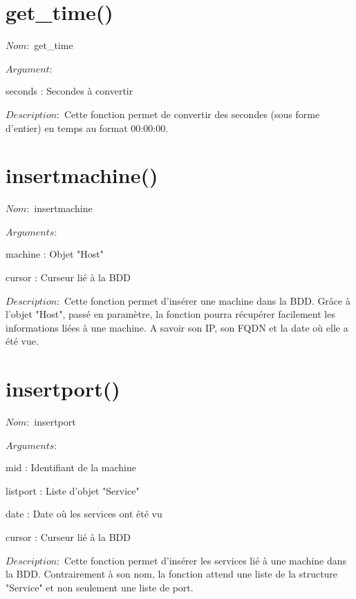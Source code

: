 \documentclass[12pt]{report}
\begin{document}
		\section{get\_time()}
			{\setlength{\parindent}{0cm}
			$Nom :$ get\_time\\\\
			}
			$Argument :$
			\begin{description}
				\item seconds : Secondes à convertir
			\end{description}
			$Description :$ Cette fonction permet de convertir des secondes (sous forme d'entier) en temps au format 00:00:00.
		\section{insertmachine()}
			{\setlength{\parindent}{0cm}
			$Nom :$ insertmachine\\\\
			}
			$Arguments :$
			\begin{description}
				\item machine : Objet "Host"
				\item cursor : Curseur lié à la BDD\\
			\end{description}
			$Description : $ Cette fonction permet d'insérer une machine dans la BDD. Grâce à l'objet "Host", passé en paramètre, la fonction pourra récupérer facilement les informations liées à une machine. A savoir son IP, son FQDN et la date où elle a été vue.
		\section{insertport()}
			{\setlength{\parindent}{0cm}
			$Nom :$ insertport\\\\
			}
			$Arguments :$
			\begin{description}
				\item mid : Identifiant de la machine
				\item listport : Liste d'objet "Service"
				\item date : Date où les services ont été vu
				\item cursor : Curseur lié à la BDD\\
			\end{description}
			$Description : $ Cette fonction permet d'insérer les services lié à une machine dans la BDD. Contrairement à son nom, la fonction attend une liste de la structure "Service" et non seulement une liste de port.
\end{document}
